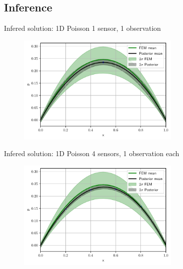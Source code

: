 \documentclass[fleqn,11pt,aspectratio=43]{beamer}
\begin{document}
\subsection{Inference}
\begin{frame}{Infered solution: 1D Poisson}
1 sensor, 1 observation
      	\begin{figure}[h]
		\begin{center}
		\includegraphics[width=0.7\textwidth]{1DPost_1P1O}
		\end{center}
		\end{figure}

	\end{frame}


\begin{frame}{Infered solution: 1D Poisson}
4 sensors, 1 observation each
      	\begin{figure}[h]
		\begin{center}
		\includegraphics[width=0.7\textwidth]{1DPost_4P1O}
		\end{center}
		\end{figure}

	\end{frame}
\end{document}
